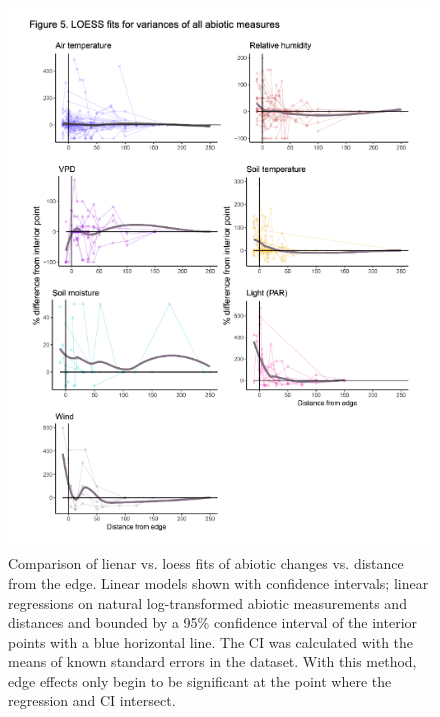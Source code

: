 \documentclass[
  man]{apa6}
\begin{document}
\begin{figure}[H]

{\centering \includegraphics[width=0.8\linewidth,]{images/temp_00009} 

}

\caption{Comparison of lienar vs. loess fits of abiotic changes vs. distance from the edge. Linear models shown with confidence intervals; linear regressions on natural log-transformed abiotic measurements and distances and bounded by a 95\% confidence interval of the interior points with a blue horizontal line. The CI was calculated with the means of known standard errors in the dataset. With this method, edge effects only begin to be significant at the point where the regression and CI intersect.}\label{fig:lin-v-loess}
\end{figure}
\end{document}
